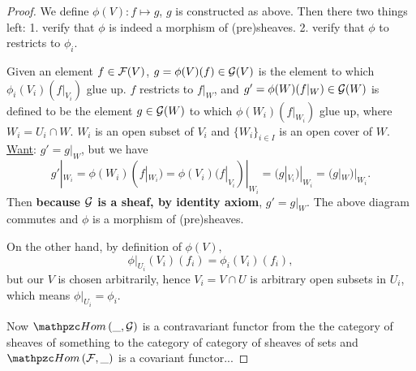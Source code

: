 \documentclass[11pt,fleqn]{book} %
\begin{document}
\begin{proof}
We define $\phi(V):f\mapsto g$, $g$ is constructed as above. 
Then there two things left: 1. verify that $\phi$ is indeed a morphism of (pre)sheaves. 2. verify that $\phi$ to restricts to $\phi_i$.
\begin{center}
\end{center}
Given an element $f\in{\cal F}(V)$, $g=\phi(V)(f)\in {\cal G}(V)$ is the element to which $\phi_i(V_i)(f|_{V_i})$ glue up. $f$ restricts to $f|_W$, and $g'=\phi(W)(f|_W)\in{\cal G}(W)$ is defined to be the element $g\in {\cal G}(W)$ to which $\phi(W_i)(f|_{W_i})$ glue up, where $W_i=U_i\cap W$. $W_i$ is an open subset of $V_i$ and $\{W_i\}_{i\in I}$ is an open cover of $W$. \underline{Want}: $g'=g|_W$, but we have
$$
g'|_{W_i}=\phi(W_i)(f|_{W_i})=\phi(V_i)(f|_{V_i})|_{W_i}=(g|_{V_i})|_{W_i}
=(g|_W)|_{W_i}.
$$
Then \textbf{because ${\cal G}$ is a sheaf, by identity axiom}, $g'=g|_W$. The above diagram commutes and $\phi$ is a morphism of (pre)sheaves.

On the other hand, by definition of $\phi(V)$,
$$
\phi|_{U_i}(V_i)(f_i)=\phi_i(V_i)(f_i),
$$
but our $V$ is chosen arbitrarily, hence $V_i=V\cap U$ is arbitrary open subsets in $U_i$, which means $\phi|_{U_i}=\phi_i$.

Now $\phom(\_,\calg)$ is a contravariant functor from the the category of sheaves of something to the category of category of sheaves of sets and $\phom(\calf,\_)$ is a covariant functor...
\end{proof}
\end{document}
